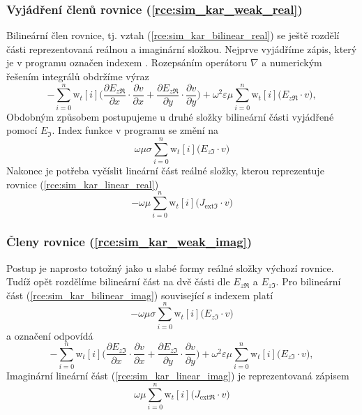 \subsubsection*{Vyjádření členů rovnice (\ref{rce:sim_kar_weak_real})}
Bilineární člen rovnice, tj. vztah (\ref{rce:sim_kar_bilinear_real}) se ještě rozdělí části reprezentovaná reálnou a imaginární složkou. Nejprve vyjádříme zápis, který je v programu označen indexem . Rozepsáním operátoru $\nabla$ a numerickým řešením integrálů obdržíme výraz
\begin{equation}
	-\sum_{i=0}^{n}\mathrm{w}_{t}[i]\bigg(\frac{\partial E_{z\Re}}{\partial x}\cdot \frac{\partial v}{\partial x} + \frac{\partial E_{z\Re}}{\partial y}\cdot \frac{\partial v}{\partial y} \bigg) + \omega^{2}\varepsilon\mu\sum_{i=0}^{n}\mathrm{w}_{t}[i]\bigg(E_{z\Re}\cdot v\bigg),
	\label{rce:sim_kar_weak_real_real_num} 
\end{equation}
Obdobným způsobem postupujeme u druhé složky bilineární části vyjádřené pomocí $E_{\Im}$. Index funkce v programu se změní na 
\begin{equation}
 \omega\mu\sigma\sum_{i=0}^{n}\mathrm{w}_{t}[i]\bigg(E_{z\Im}\cdot v\bigg)
	\label{rce:sim_kar_weak_real_imag_num} 
\end{equation}
Nakonec je potřeba vyčíslit lineární část reálné složky, kterou reprezentuje rovnice (\ref{rce:sim_kar_linear_real})
\begin{equation}
 -\omega\mu\sum_{i=0}^{n}\mathrm{w}_{t}[i]\bigg(J_{\mathrm{ext}\Im}\cdot v\bigg)
	\label{rce:sim_kar_linear_real_num} 
\end{equation}


\subsubsection*{Členy rovnice (\ref{rce:sim_kar_weak_imag})}
Postup je naprosto totožný jako u slabé formy reálné složky výchozí rovnice. Tudíž opět rozdělíme bilineární část na dvě části dle $E_{z\Re}$ a $E_{z\Im}$. Pro bilineární část (\ref{rce:sim_kar_bilinear_imag}) související s indexem  platí
\begin{equation}
 -\omega\mu\sigma\sum_{i=0}^{n}\mathrm{w}_{t}[i]\bigg(E_{z\Im}\cdot v\bigg)
	\label{rce:sim_kar_weak_imag_real_num} 
\end{equation}
a označení  odpovídá
\begin{equation}
	-\sum_{i=0}^{n}\mathrm{w}_{t}[i]\bigg(\frac{\partial E_{z\Im}}{\partial x}\cdot \frac{\partial v}{\partial x} + \frac{\partial E_{z\Im}}{\partial y}\cdot \frac{\partial v}{\partial y} \bigg) + \omega^{2}\varepsilon\mu\sum_{i=0}^{n}\mathrm{w}_{t}[i]\bigg(E_{z\Im}\cdot v\bigg),
	\label{rce:sim_kar_weak_imag_imag_num} 
\end{equation}
Imaginární lineární část (\ref{rce:sim_kar_linear_imag}) je reprezentovaná zápisem
\begin{equation}
 \omega\mu\sum_{i=0}^{n}\mathrm{w}_{t}[i]\bigg(J_{\mathrm{ext}\Re}\cdot v\bigg)
	\label{rce:sim_kar_linear_imag_num} 
\end{equation}

